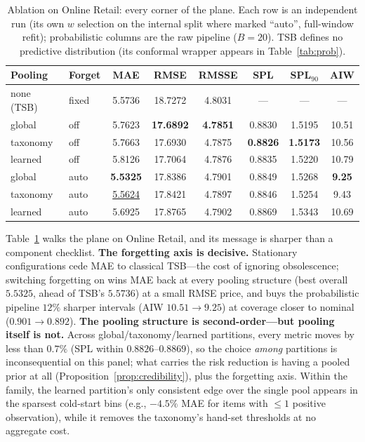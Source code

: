 \documentclass[twocolumn,10pt]{article}
\newcommand{\best}[1]{\textbf{#1}}
\newcommand{\secondbest}[1]{\underline{#1}}
\begin{document}
\begin{table}[t]
\centering
\caption{Ablation on Online Retail: every corner of the plane. Each row
is an independent run (its own $w$ selection on the internal split where
marked ``auto'', full-window refit); probabilistic columns are the raw
pipeline ($B{=}20$). TSB defines no predictive distribution (its
conformal wrapper appears in Table~\ref{tab:prob}).}
\label{tab:ablation}
\small
\setlength{\tabcolsep}{2.9pt}
\begin{tabular}{llcccccc}
\toprule
Pooling & Forget & MAE & RMSE & RMSSE & SPL & SPL$_{90}$ & AIW\\
\midrule
none (TSB) & fixed & 5.5736 & 18.7272 & 4.8031 & --- & --- & ---\\
global & off & 5.7623 & \best{17.6892} & \best{4.7851} & 0.8830 & 1.5195 & 10.51\\
taxonomy & off & 5.7663 & 17.6930 & 4.7875 & \best{0.8826} & \best{1.5173} & 10.56\\
learned & off & 5.8126 & 17.7064 & 4.7876 & 0.8835 & 1.5220 & 10.79\\
global & auto & \best{5.5325} & 17.8386 & 4.7901 & 0.8849 & 1.5268 & \best{9.25}\\
taxonomy & auto & \secondbest{5.5624} & 17.8421 & 4.7897 & 0.8846 & 1.5254 & 9.43\\
learned & auto & 5.6925 & 17.8765 & 4.7902 & 0.8869 & 1.5343 & 10.69\\
\bottomrule
\end{tabular}
\end{table}

Table~\ref{tab:ablation} walks the plane on Online Retail, and its
message is sharper than a component checklist. \textbf{The forgetting
axis is decisive.} Stationary configurations cede MAE to classical
TSB---the cost of ignoring obsolescence; switching forgetting on wins
MAE back at every pooling structure (best overall $5.5325$, ahead of
TSB's $5.5736$) at a small RMSE price, and buys the probabilistic
pipeline $12\%$ sharper intervals (AIW $10.51\!\to\!9.25$) at coverage
closer to nominal ($0.901\!\to\!0.892$). \textbf{The pooling structure
is second-order---but pooling itself is not.} Across
global/taxonomy/learned partitions, every metric moves by less than
$0.7\%$ (SPL within $0.8826$--$0.8869$), so the choice \emph{among}
partitions is inconsequential on this panel; what carries the risk
reduction is having a pooled prior at all
(Proposition~\ref{prop:credibility}), plus the forgetting axis. Within
the family, the learned partition's only consistent edge over the single
pool appears in the sparsest cold-start bins (e.g., $-4.5\%$ MAE for
items with $\le1$ positive observation), while it removes the
taxonomy's hand-set thresholds at no aggregate cost.
\end{document}
